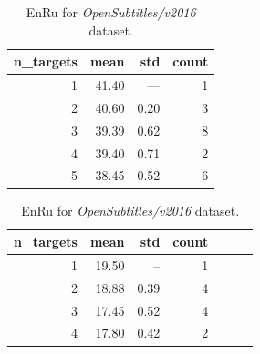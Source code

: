 \begin{table}[h!]
\begin{subtable}[t]{0.45\linewidth}
	\centering
	\begin{tabular}{rrrr}
	\toprule
	n\_targets &   mean &   std & count \\
	\midrule
	         1 &  41.40 &  ---  &   1 \\
	         2 &  40.60 &  0.20 &   3 \\
	         3 &  39.39 &  0.62 &   8 \\
	         4 &  39.40 &  0.71 &   2 \\
	         5 &  38.45 &  0.52 &   6 \\
	\bottomrule
	\end{tabular}

	\caption{
		En\to{}Bg for \emph{Europarl/v7} dataset.
		}
	\label{tab:bg/Europarl/v7}
\end{subtable}
\begin{subtable}[t]{0.45\linewidth}
	\centering
	\begin{tabular}{rrrrrrr}
	\toprule
	n\_targets &      mean &  std & count \\
	\midrule
	        1  &     19.50 &  --  &     1 \\
	        2  &     18.88 & 0.39 &     4 \\
	        3  &     17.45 & 0.52 &     4 \\
	        4  &     17.80 & 0.42 &     2 \\
	\bottomrule
	\end{tabular}
	
	\caption{
		En\to{}Ru for \emph{OpenSubtitles/v2016} dataset.
		}
	\label{ table:ru/OpenSubtitles/v2016 }
\end{subtable}
\end{table}



% 

